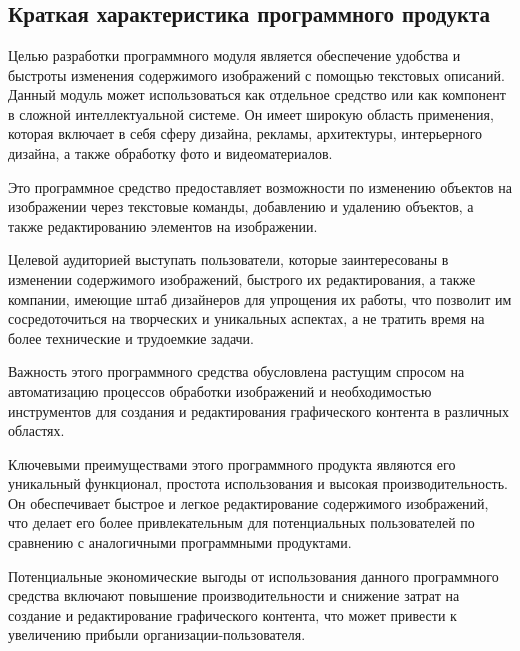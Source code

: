 \section{\texorpdfstring{\MakeUppercase \economicalPartName}{\economicalPartName}}


\subsection{Краткая характеристика программного продукта}

Целью разработки программного модуля является обеспечение удобства и быстроты изменения содержимого изображений с помощью текстовых описаний. Данный модуль может использоваться как отдельное средство или как компонент в сложной интеллектуальной системе. Он имеет широкую область применения, которая включает в себя сферу дизайна, рекламы, архитектуры, интерьерного дизайна, а также обработку фото и видеоматериалов.

Это программное средство предоставляет возможности по изменению объектов на изображении через текстовые команды, добавлению и удалению объектов, а также редактированию элементов на изображении.

Целевой аудиторией выступать пользователи, которые заинтересованы в изменении содержимого изображений, быстрого их редактирования, а также компании, имеющие штаб дизайнеров для упрощения их работы, что позволит им сосредоточиться на творческих и уникальных аспектах, а не тратить время на более технические и трудоемкие задачи.

Важность этого программного средства обусловлена растущим спросом на автоматизацию процессов обработки изображений и необходимостью инструментов для создания и редактирования графического контента в различных областях.

Ключевыми преимуществами этого программного продукта являются его уникальный функционал, простота использования и высокая производительность. Он обеспечивает быстрое и легкое редактирование содержимого изображений, что делает его более привлекательным для потенциальных пользователей по сравнению с аналогичными программными продуктами.

Потенциальные экономические выгоды от использования данного программного средства включают повышение производительности и снижение затрат на создание и редактирование графического контента, что может привести к увеличению прибыли организации-пользователя.

